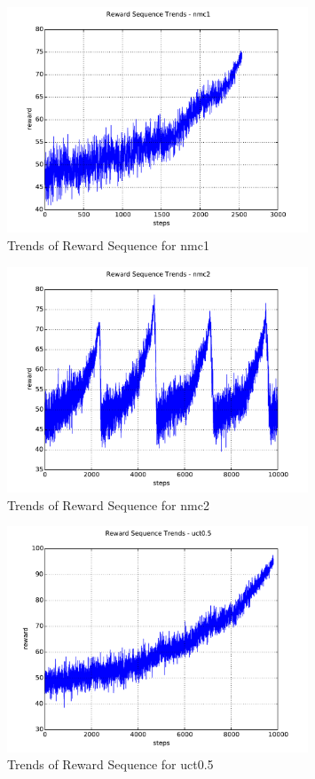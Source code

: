 \documentclass{article}
\begin{document}
\begin{figure}[htb!]
\centering
\includegraphics[width=0.8\textwidth]{trends_nmc1.pdf}
\caption{\label{fig:trends_nmc1}Trends of Reward Sequence for nmc1}
\end{figure}

\begin{figure}[htb!]
\centering
\includegraphics[width=0.8\textwidth]{trends_nmc2.pdf}
\caption{\label{fig:trends_nmc2}Trends of Reward Sequence for nmc2}
\end{figure}

\begin{figure}[htb!]
\centering
\includegraphics[width=0.8\textwidth]{trends_uct0_5.pdf}
\caption{\label{fig:trends_uct0.5}Trends of Reward Sequence for uct0.5}
\end{figure}
\end{document}
